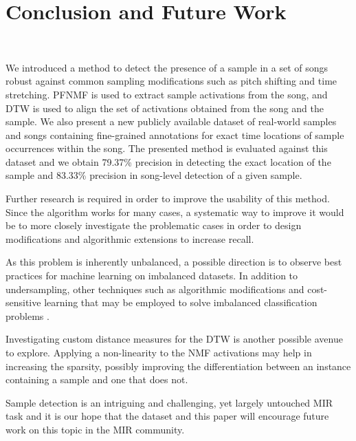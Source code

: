 \documentclass{article}
\begin{document}
\section{Conclusion and Future Work}


\



We introduced a method to detect the presence of a sample in a set of songs robust against common sampling modifications such as pitch shifting and time stretching. PFNMF is used to extract sample activations from the song, and DTW is used to align the set of activations obtained from the song and the sample. 
We also present a new publicly available dataset of real-world samples and songs containing fine-grained annotations for exact time locations of sample occurrences within the song. The presented method is evaluated against this dataset and we obtain 79.37\% precision in detecting the exact location of the sample and 83.33\% precision in song-level detection of a given sample. %

Further research is required in order to improve the usability of this method. Since the algorithm works for many cases, a systematic way to improve it would be to more closely investigate the problematic cases in order to design modifications and algorithmic extensions to increase recall.

As this problem is inherently unbalanced, a possible direction is to observe best practices for machine learning on imbalanced datasets. In addition to undersampling, other techniques such as algorithmic modifications and cost-sensitive learning that may be employed to solve imbalanced classification problems \cite{lopez2013insight}.

Investigating custom distance measures for the DTW is another possible avenue to explore. Applying a non-linearity to the NMF activations may help in increasing the sparsity, possibly improving the differentiation between an instance containing a sample and one that does not.

Sample detection is an intriguing and challenging, yet largely untouched MIR task and it is our hope that the dataset and this paper will encourage future work on this topic in the MIR community.
\newpage

\end{document}
